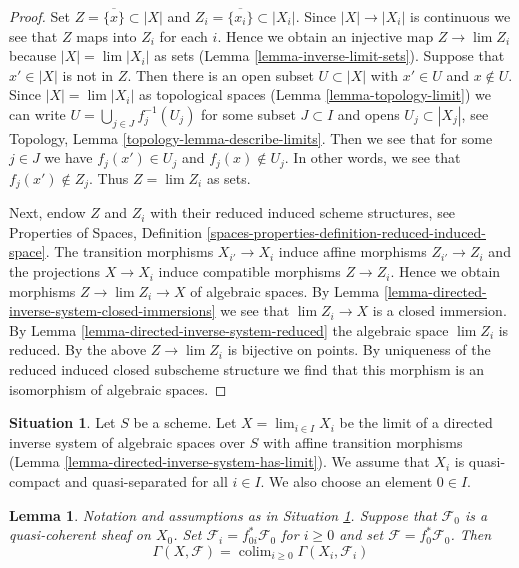 \documentclass{stacks-project}
\theoremstyle{plain}
\newtheorem{lemma}[subsection]{Lemma}
\theoremstyle{definition}
\newtheorem{situation}[subsection]{Situation}
\theoremstyle{remark}
\numberwithin{equation}{subsection}
\def\lim{\mathop{\mathrm{lim}}\nolimits}
\def\colim{\mathop{\mathrm{colim}}\nolimits}
\begin{document}
\begin{proof}
Set $Z = \overline{\{x\}} \subset |X|$ and
$Z_i = \overline{\{x_i\}} \subset |X_i|$.
Since $|X| \to |X_i|$ is continuous we see that $Z$ maps into $Z_i$
for each $i$. Hence we obtain an injective map $Z \to \lim Z_i$
because $|X| = \lim |X_i|$ as sets (Lemma \ref{lemma-inverse-limit-sets}).
Suppose that $x' \in |X|$ is not in $Z$.
Then there is an open subset $U \subset |X|$ with $x' \in U$
and $x \not \in U$. Since
$|X| = \lim |X_i|$ as topological spaces (Lemma \ref{lemma-topology-limit})
we can write $U = \bigcup_{j \in J} f_j^{-1}(U_j)$
for some subset $J \subset I$ and opens $U_j \subset |X_j|$, see
Topology, Lemma \ref{topology-lemma-describe-limits}.
Then we see that for some $j \in J$ we have $f_j(x') \in U_j$
and $f_j(x) \not \in U_j$. In other words, we see that $f_j(x') \not \in Z_j$.
Thus $Z = \lim Z_i$ as sets.

\medskip\noindent
Next, endow $Z$ and $Z_i$ with their reduced induced scheme structures, see
Properties of Spaces, Definition
\ref{spaces-properties-definition-reduced-induced-space}.
The transition morphisms $X_{i'} \to X_i$ induce affine
morphisms $Z_{i'} \to Z_i$ and the projections $X \to X_i$
induce compatible morphisms $Z \to Z_i$.
Hence we obtain morphisms $Z \to \lim Z_i \to X$ of algebraic spaces.
By Lemma \ref{lemma-directed-inverse-system-closed-immersions}
we see that $\lim Z_i \to X$ is a
closed immersion. By Lemma \ref{lemma-directed-inverse-system-reduced}
the algebraic space $\lim Z_i$ is reduced.
By the above $Z \to \lim Z_i$ is bijective on points.
By uniqueness of the reduced induced closed subscheme structure
we find that this morphism is an isomorphism of algebraic spaces.
\end{proof}

\begin{situation}
\label{situation-descent}
Let $S$ be a scheme. Let $X = \lim_{i \in I} X_i$ be the limit of a directed
inverse system of algebraic spaces over $S$ with affine transition morphisms
(Lemma \ref{lemma-directed-inverse-system-has-limit}).
We assume that $X_i$ is quasi-compact and quasi-separated for all $i \in I$.
We also choose an element $0 \in I$.
\end{situation}

\begin{lemma}
\label{lemma-descend-section}
Notation and assumptions as in Situation \ref{situation-descent}.
Suppose that $\mathcal{F}_0$ is a quasi-coherent sheaf on $X_0$.
Set $\mathcal{F}_i = f_{0i}^*\mathcal{F}_0$ for $i \geq 0$ and set
$\mathcal{F} = f_0^*\mathcal{F}_0$. Then
$$
\Gamma(X, \mathcal{F}) = \colim_{i \geq 0} \Gamma(X_i, \mathcal{F}_i)
$$
\end{lemma}
\end{document}
